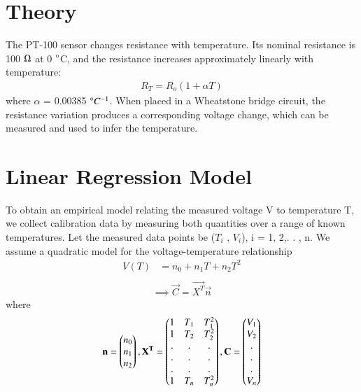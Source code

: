 \documentclass[journal,12pt,onecolumn]{IEEEtran}
\begin{document}
\vspace{2cm}

\section{\textbf{Theory}}
The PT-100 sensor changes resistance with temperature. Its nominal resistance is 100 $\ohm$
at 0 $\degree$C, and the resistance increases approximately linearly with temperature:
\begin{align}
R_T = R_o(1 + \alpha T)
\end{align}
where $\alpha$ = 0.00385 $\degree C^{-1}$. When placed in a Wheatstone bridge circuit, the resistance variation produces a corresponding voltage change, which can be measured and used to infer the temperature.


\section{\textbf{Linear Regression Model}}
To obtain an empirical model relating the measured voltage V to temperature T, we collect calibration data by measuring both quantities over a range of known temperatures. Let the measured data points be ($T_i$ , $V_i$), i = 1, 2,. . , n. We assume a quadratic model for the voltage-temperature relationship
\begin{align}
    V(T) &= n_0+n_1T+n_2T^2 \\
\end{align}
\begin{align}
    \implies \vec{C} = \vec{X^T}\vec{n}  \label{eq:model}
\end{align}
where
\begin{align}
    \mathbf{n}=\begin{pmatrix}n_0 \\ n_1 \\ n_2\end{pmatrix}, 
   \mathbf{X^T} = \begin{pmatrix}1 & T_1 & T_1^2 \\ 1 & T_2 & T_2^2 \\ . & . & .\\ . & . & .\\ . & . & . \\ 1 & T_n & T_n^2\end{pmatrix}, \mathbf{C} = \begin{pmatrix}V_1 \\ V_2 \\ . \\ . \\ . \\ V_n\end{pmatrix}
    \label{eq:x-y-theta-def}
\end{align}
\end{document}
